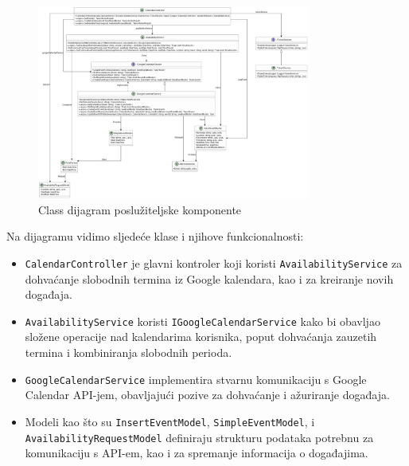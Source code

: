\documentclass{foi}
\begin{document}
\begin{figure}[H]
    \centering
    \includegraphics[width=0.8\textwidth]{slike/MeetingPlannerAPI_ClassUML.png}
    \caption{Class dijagram poslužiteljske komponente}
    \label{fig:backend-uml}
\end{figure}

Na dijagramu vidimo sljedeće klase i njihove funkcionalnosti:
\begin{itemize}
    \item \texttt{CalendarController} je glavni kontroler koji koristi \texttt{AvailabilityService} za dohvaćanje slobodnih termina iz Google kalendara, kao i za kreiranje novih događaja.
    \item \texttt{AvailabilityService} koristi \texttt{IGoogleCalendarService} kako bi obavljao složene operacije nad kalendarima korisnika, poput dohvaćanja zauzetih termina i kombiniranja slobodnih perioda.
    \item \texttt{GoogleCalendarService} implementira stvarnu komunikaciju s Google Calendar API-jem, obavljajući pozive za dohvaćanje i ažuriranje događaja.
    \item Modeli kao što su \texttt{InsertEventModel}, \texttt{SimpleEventModel}, i \texttt{AvailabilityRequestModel} definiraju strukturu podataka potrebnu za komunikaciju s API-em, kao i za spremanje informacija o događajima.
\end{itemize}
\end{document}
